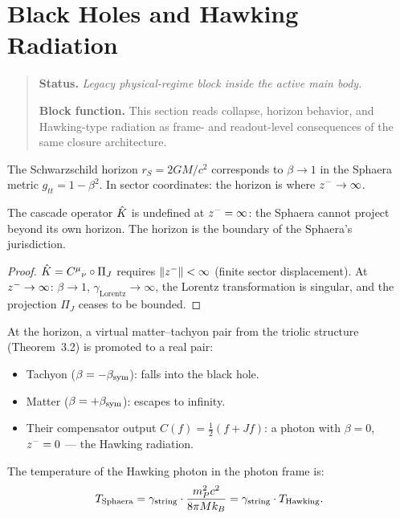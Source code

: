 \section{Black Holes and Hawking Radiation}
\begin{quote}\small
\noindent\textbf{Status.} \emph{Legacy physical-regime block inside the active main body.}\par
\noindent\textbf{Block function.} This section reads collapse, horizon behavior, and Hawking-type radiation as frame- and readout-level consequences of the same closure architecture.
\end{quote}
\label{sec:bh}

\begin{definition}
The Schwarzschild horizon $r_S=2GM/c^2$ corresponds to $\beta\to 1$ in
the Sphaera metric $g_{tt}=1-\beta^2$.
In sector coordinates: the horizon is where $z^-\to\infty$.
\end{definition}

\begin{proposition}
\label{prop:horizon-cascade-singularity}
The cascade operator $\hat{K}$ is undefined at $z^-=\infty$: the Sphaera
cannot project beyond its own horizon.
The horizon is the boundary of the Sphaera's jurisdiction.
\begin{proof}
$\hat{K}=C^\mu{}_\nu\circ\Pi_J$ requires $\|z^-\|<\infty$
(finite sector displacement).
At $z^-\to\infty$: $\beta\to 1$, $\gamma_{\mathrm{Lorentz}}\to\infty$,
the Lorentz transformation is singular, and the projection $\Pi_J$ ceases
to be bounded.
\end{proof}
\end{proposition}

\begin{theorem}
\label{thm:hawking-triolic}
At the horizon, a virtual matter--tachyon pair from the triolic structure
(Theorem~3.2) is promoted to a real pair:
\begin{itemize}
  \item Tachyon ($\beta=-\beta_{\mathrm{sym}}$): falls into the black hole.
  \item Matter ($\beta=+\beta_{\mathrm{sym}}$): escapes to infinity.
  \item Their compensator output $C(f)=\tfrac{1}{2}(f+Jf)$: a photon
        with $\beta=0$, $z^-=0$ --- the Hawking radiation.
\end{itemize}
The temperature of the Hawking photon in the photon frame is:
\[
  T_{\mathrm{Sphaera}}
  = \gamma_{\mathrm{string}}\cdot\frac{m_P^2 c^2}{8\pi M k_B}
  = \gamma_{\mathrm{string}}\cdot T_{\mathrm{Hawking}}.
\]
\end{theorem}

